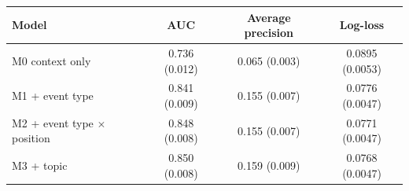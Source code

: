 \begin{tabular}{@{}lccc@{}}\toprule
Model & AUC & Average precision & Log-loss \\\midrule
M0 context only & 0.736 (0.012) & 0.065 (0.003) & 0.0895 (0.0053) \\
M1 + event type & 0.841 (0.009) & 0.155 (0.007) & 0.0776 (0.0047) \\
M2 + event type $\times$ position & 0.848 (0.008) & 0.155 (0.007) & 0.0771 (0.0047) \\
M3 + topic & 0.850 (0.008) & 0.159 (0.009) & 0.0768 (0.0047) \\
\bottomrule\end{tabular}
